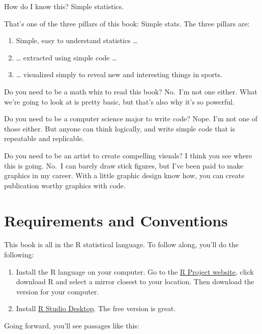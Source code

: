 \documentclass[
]{book}
\providecommand{\tightlist}{%
  \setlength{\itemsep}{0pt}\setlength{\parskip}{0pt}}
\begin{document}
How do I know this? Simple statistics.

That's one of the three pillars of this book: Simple stats. The three pillars are:

\begin{enumerate}
\def\labelenumi{\arabic{enumi}.}
\tightlist
\item
  Simple, easy to understand statistics \ldots{}
\item
  \ldots{} extracted using simple code \ldots{}
\item
  \ldots{} visualized simply to reveal new and interesting things in sports.
\end{enumerate}

Do you need to be a math whiz to read this book? No.~I'm not one either. What we're going to look at is pretty basic, but that's also why it's so powerful.

Do you need to be a computer science major to write code? Nope. I'm not one of those either. But anyone can think logically, and write simple code that is repeatable and replicable.

Do you need to be an artist to create compelling visuals? I think you see where this is going. No.~I can barely draw stick figures, but I've been paid to make graphics in my career. With a little graphic design know how, you can create publication worthy graphics with code.

\hypertarget{requirements-and-conventions}{%
\section{Requirements and Conventions}\label{requirements-and-conventions}}

This book is all in the R statistical language. To follow along, you'll do the following:

\begin{enumerate}
\def\labelenumi{\arabic{enumi}.}
\item
  Install the R language on your computer. Go to the \href{https://www.r-project.org/}{R Project website}, click download R and select a mirror closest to your location. Then download the version for your computer.
\item
  Install \href{https://www.rstudio.com/products/rstudio/\#Desktop}{R Studio Desktop}. The free version is great.
\end{enumerate}

Going forward, you'll see passages like this:
\end{document}
